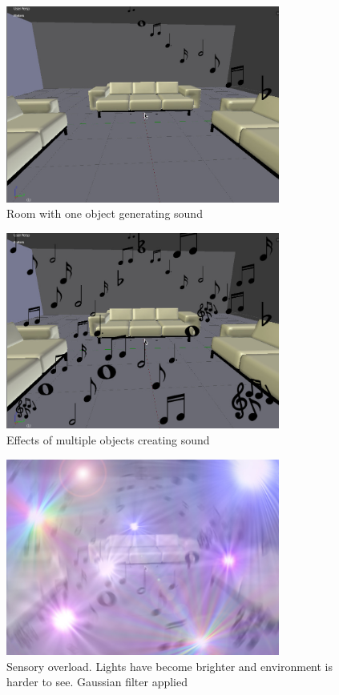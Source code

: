 \documentclass[11pt]{report}
\begin{document}
\begin{figure}[H]
\centering
\includegraphics[width=90mm]{images/GD_basic.jpg}
\caption{Room with one object generating sound}
\label{sensorymockup1}
\end{figure}

\begin{figure}[H]
\centering
\includegraphics[width=90mm]{images/GD_moresound.jpg}
\caption{Effects of multiple objects creating sound}
\label{sensorymockup2}
\end{figure}

\begin{figure}[H]
\centering
\includegraphics[width=90mm]{images/GD_overload.jpg}
\caption{Sensory overload. Lights have become brighter and environment is harder to see. Gaussian filter applied}
\label{sensoryoverloadmockup}
\end{figure}
\end{document}
